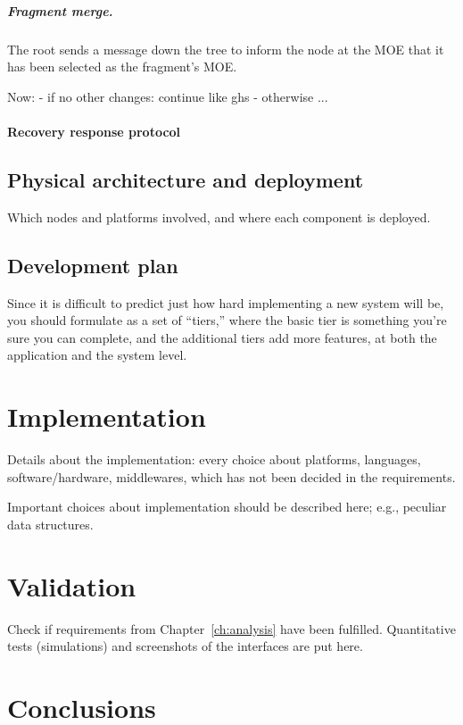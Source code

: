 \documentclass{memoir}
\begin{document}
\paragraph{Fragment merge.}
The root sends a message down the tree to inform the node at the MOE that it has been
selected as the fragment's MOE.

Now:
- if no other changes: continue like ghs
- otherwise ...

\subsubsection{Recovery response protocol}
\section{Physical architecture and deployment}
Which nodes and platforms involved, and where each component is deployed.

\section{Development plan}
Since it is difficult to predict just how hard implementing a new system will be, you should formulate as a set of ``tiers,'' where the basic tier is something you’re sure you can complete, and the additional tiers add more features, at both the application and the system level.

\chapter{Implementation}

Details about the implementation: every choice about platforms, languages, software/hardware, middlewares, which has not been decided in the requirements.


Important choices about implementation should be described here; e.g., peculiar data structures.


\chapter{Validation}

Check if requirements from Chapter~\ref{ch:analysis} have been fulfilled.
Quantitative tests (simulations) and screenshots of the interfaces are put here.


\chapter{Conclusions}
\end{document}
